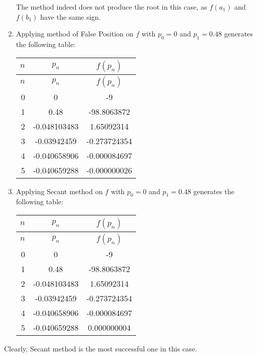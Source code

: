 \documentclass[../../../../Assignments]{subfiles}
\begin{document}
\begin{solution}
\begin{enumerate}[label = \alph*)]
            The method indeed does not produce the root in this case, as
            \(f(a_1)\) and \(f(b_1)\) have the same sign.

        \item Applying method of False Position on \(f\) with \(p_0 = 0\) and
            \(p_1 = \num{0.48}\) generates the following table:

            \begin{longtable}{r S[table-format=-1.9] S[table-format=-2.9]}
                \toprule
                \(n\)  &    {\(p_n\)}    &   {\(f(p_n)\)}   \\
                \midrule
                \endfirsthead
                \(n\)  &    {\(p_n\)}    &   {\(f(p_n)\)}   \\
                \midrule
                  &   0             &   -9             \\
                    1  &   0.48          &  -98.8063872     \\
                    2  &  -0.048103483   &    1.65092314    \\
                    3  &  -0.03942459    &   -0.273724354   \\
                    4  &  -0.040658906   &   -0.000084697   \\
                    5  &  -0.040659288   &   -0.000000026   \\
                \bottomrule
            \end{longtable}

        \item Applying Secant method on \(f\) with \(p_0 = 0\) and \(p_1 =
            \num{0.48}\) generates the following table:

            \begin{longtable}{r S[table-format=-1.9] S[table-format=-2.9]}
                \toprule
                \(n\)  &    {\(p_n\)}    &   {\(f(p_n)\)}   \\
                \midrule
                \endfirsthead
                \(n\)  &    {\(p_n\)}    &   {\(f(p_n)\)}   \\
                \midrule
                  &   0             &   -9             \\
                    1  &   0.48          &  -98.8063872     \\
                    2  &  -0.048103483   &    1.65092314    \\
                    3  &  -0.03942459    &   -0.273724354   \\
                    4  &  -0.040658906   &   -0.000084697   \\
                    5  &  -0.040659288   &    0.000000004   \\
                \bottomrule
            \end{longtable}
    \end{enumerate}

    Clearly, Secant method is the most successful one in this case.
\end{solution}
\end{document}
